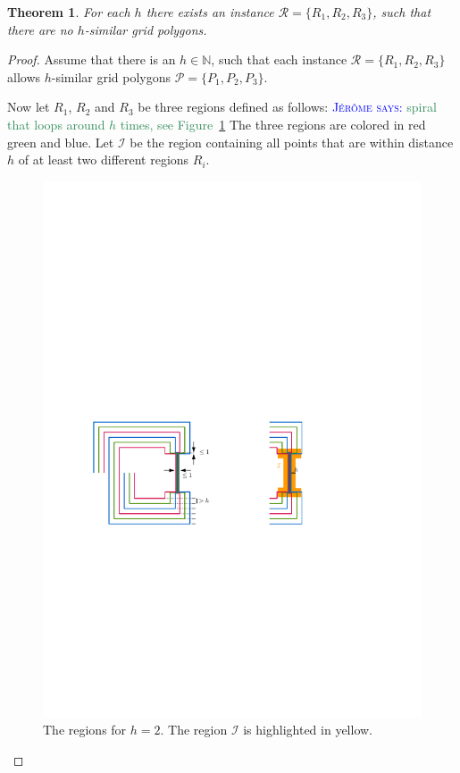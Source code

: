 \documentclass[a4paper, 11pt]{article}
\newtheorem{theorem}{Theorem}
\newcommand{\mremark}[3]{\textcolor{blue}{\textsc{#1 #2:}} \textcolor{SeaGreen}{\textsf{#3}}}
\newcommand{\jerome}[2][says]{\mremark{J\'er\^ome}{#1}{#2}}
\newcommand{\ixi}{\mathcal{I}}
\begin{document}
\begin{theorem}\label{thm:unbouded}
For each $h$ there exists an instance $\mathcal{R}=\{R_1, R_2, R_3\}$, such that there are no $h$-similar grid polygons.
\end{theorem}
\begin{proof}
Assume that there is an $h\in \mathbb{N}$, such that each instance $\mathcal{R}=\{R_1, R_2, R_3\}$ allows $h$-similar grid polygons $\mathcal{P}=\{P_1, P_2, P_3\}$.

Now let $R_1$, $R_2$ and $R_3$ be three regions defined as follows:
\jerome{spiral that loops around $h$ times, see Figure~\ref{fig:arbitrary-spirals}}
The three regions are colored in red green and blue.
Let $\ixi$ be the region containing all points that are within distance $h$ of at least two different regions $R_i$.

\begin{figure}
\centering
\includegraphics[scale=1]{Figures/arbitrary-lower-by-spirals.pdf}
\caption{The regions for $h=2$. The region $\ixi$ is highlighted in yellow.}
\label{fig:arbitrary-spirals}
\end{figure}


\end{proof}
\end{document}
